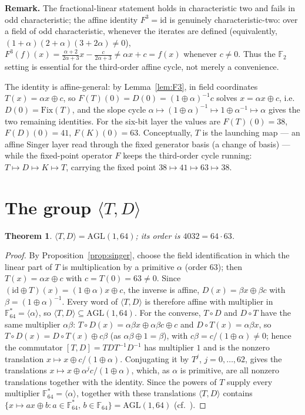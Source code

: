 \documentclass[11pt]{article}
\newtheorem{theorem}{Theorem}[section]
\begin{document}
\textbf{Remark.} The fractional-linear statement holds in characteristic two and fails in odd
characteristic; the affine identity $F^3=\mathrm{id}$ is genuinely characteristic-two: over a field of odd
characteristic, whenever the iterates are defined (equivalently,
$(1+\alpha)(2+\alpha)(3+2\alpha)\neq0$),
$F^3(f)(x)=\frac{\alpha+2}{2\alpha+3}x-\frac{c}{2\alpha+3}\neq\alpha x+c=f(x)$
whenever $c\neq0$. Thus the
$\mathbb{F}_2$ setting is essential for the third-order affine cycle, not merely a
convenience.

The identity is affine-general: by Lemma~\ref{lem:F3}, in field coordinates
$T(x)=\alpha x\oplus c$, so
$F(T)(0)=D(0)=(1\oplus\alpha)^{-1}c$ solves $x=\alpha x\oplus c$, i.e.\
$D(0)=\mathrm{Fix}(T)$, and the slope cycle
$\alpha\mapsto(1\oplus\alpha)^{-1}\mapsto1\oplus\alpha^{-1}\mapsto\alpha$ gives the
two remaining identities. For the six-bit layer the values are $F(T)(0)=38$,
$F(D)(0)=41$, $F(K)(0)=63$.
Conceptually, $T$ is the launching map --- an affine Singer layer read through the
fixed generator basis (a change of basis) --- while the fixed-point operator $F$ keeps
the third-order cycle running: $T\mapsto D\mapsto K\mapsto T$, carrying the fixed
point $38\mapsto41\mapsto63\mapsto38$.

\section[The group generated by T and D]{The group $\langle T,D\rangle$}\label{sec:group}
\begin{theorem}\label{thm:agld}
$\langle T,D\rangle=\mathrm{AGL}(1,64)$; its order is $4032=64\cdot63$.
\end{theorem}
\begin{proof}
By Proposition~\ref{prop:singer}, choose the field identification in which the linear
part of $T$ is multiplication by a primitive $\alpha$ (order $63$); then
$T(x)=\alpha x\oplus c$ with $c=T(0)=63\ne0$. Since
$(\mathrm{id}\oplus T)(x)=(1\oplus\alpha)x\oplus c$, the inverse is affine,
$D(x)=\beta x\oplus\beta c$ with $\beta=(1\oplus\alpha)^{-1}$. Every word of
$\langle T,D\rangle$ is therefore affine with multiplier in
$\mathbb{F}_{64}^*=\langle\alpha\rangle$, so
$\langle T,D\rangle\subseteq\mathrm{AGL}(1,64)$.
For the converse, $T\circ D$ and $D\circ T$ have the same multiplier $\alpha\beta$:
$T\circ D(x)=\alpha\beta x\oplus\alpha\beta c\oplus c$ and $D\circ T(x)=\alpha\beta x$,
so $T\circ D(x)=D\circ T(x)\oplus c\beta$ (as $\alpha\beta\oplus1=\beta$), with
$c\beta=c/(1\oplus\alpha)\ne0$;
hence the commutator $[T,D]=TDT^{-1}D^{-1}$ has multiplier $1$ and is the nonzero translation
$x\mapsto x\oplus c/(1\oplus\alpha)$. Conjugating it by $T^j$,
$j=0,\dots,62$, gives the translations $x\mapsto x\oplus\alpha^j c/(1\oplus\alpha)$,
which, as $\alpha$ is primitive, are all nonzero translations together with the
identity. Since the powers of $T$ supply every multiplier
$\mathbb{F}_{64}^*=\langle\alpha\rangle$, together with these translations
$\langle T,D\rangle$ contains
$\{x\mapsto ax\oplus b: a\in\mathbb{F}_{64}^*,\,b\in\mathbb{F}_{64}\}
=\mathrm{AGL}(1,64)$ (cf.\ \cite{DM}).
\end{proof}
\end{document}
